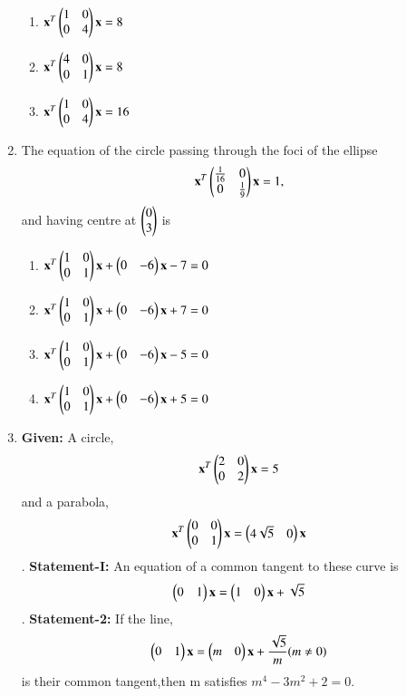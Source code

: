 \begin{enumerate}[label=\arabic*.,ref=\thesubsection.\theenumi]
\begin{enumerate}
    \item $\mathbf{x}^T\begin{pmatrix}1&0\\0&4\end{pmatrix}\mathbf{x}=8$ 
    \item $\mathbf{x}^T\begin{pmatrix}4&0\\0&1\end{pmatrix}\mathbf{x}=8$
    \item $\mathbf{x}^T\begin{pmatrix}1&0\\0&4\end{pmatrix}\mathbf{x}=16$ 
    \end{enumerate}
    \item The equation of the circle passing through the foci of the ellipse 
    \begin{align}
    \mathbf{x}^T\begin{pmatrix}\frac{1}{16}&0\\0&\frac{1}{9}\end{pmatrix}\mathbf{x}=1,
    \end{align} and having centre at $\begin{pmatrix}0\\3\end{pmatrix}$ is 
    \begin{enumerate}
    \item $\mathbf{x}^T\begin{pmatrix}1&0\\0&1\end{pmatrix}\mathbf{x}+\begin{pmatrix}0&-6\end{pmatrix}\mathbf{x}-7=0$
    \item $\mathbf{x}^T\begin{pmatrix}1&0\\0&1\end{pmatrix}\mathbf{x}+\begin{pmatrix}0&-6\end{pmatrix}\mathbf{x}+7=0$
    \item $\mathbf{x}^T\begin{pmatrix}1&0\\0&1\end{pmatrix}\mathbf{x}+\begin{pmatrix}0&-6\end{pmatrix}\mathbf{x}-5=0$
    \item $\mathbf{x}^T\begin{pmatrix}1&0\\0&1\end{pmatrix}\mathbf{x}+\begin{pmatrix}0&-6\end{pmatrix}\mathbf{x}+5=0$
    \end{enumerate}
    \item \textbf{Given:} A circle,
    \begin{align}
    \mathbf{x}^T\begin{pmatrix}2&0\\0&2\end{pmatrix}\mathbf{x}=5
    \end{align} and a parabola,
    \begin{align}
    \mathbf{x}^T\begin{pmatrix}0&0\\0&1\end{pmatrix}\mathbf{x}=\begin{pmatrix}4\sqrt{5}&0\end{pmatrix}\mathbf{x}
    \end{align}.
    \textbf{Statement-I:} An equation of a common tangent to these curve is 
    \begin{align}
    \begin{pmatrix}0&1\end{pmatrix}\mathbf{x}=\begin{pmatrix}1&0\end{pmatrix}\mathbf{x}+\sqrt{5}
    \end{align}.
    \textbf{Statement-2:} If the line,
    \begin{align}
    \begin{pmatrix}0&1\end{pmatrix}\mathbf{x}=\begin{pmatrix}m&0\end{pmatrix}\mathbf{x}+\frac{\sqrt{5}}{m}(m\neq0)
    \end{align}is their common tangent,then m satisfies $m^4-3m^2+2=0$.

\end{enumerate}

